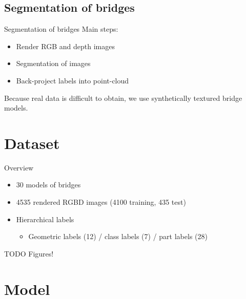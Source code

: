 \documentclass{beamer}
\begin{document}
\subsection{Segmentation of bridges}

\begin{frame}{Segmentation of bridges}
  Main steps:
  \begin{itemize}
  \item Render RGB and depth images
  \item Segmentation of images
  \item Back-project labels into point-cloud
  \end{itemize}
  Because real data is difficult to obtain, we use synthetically
  textured bridge models.
\end{frame}

\section{Dataset}

\begin{frame}{Overview}
  \begin{itemize}
  \item 30 models of bridges
  \item 4535 rendered RGBD images (4100 training, 435 test)
  \item Hierarchical labels
    \begin{itemize}
    \item Geometric labels (12) / class labels (7) / part labels (28)
    \end{itemize}
  \end{itemize}
\end{frame}

\begin{frame}{TODO}
  Figures!
\end{frame}

\section{Model}
\end{document}
